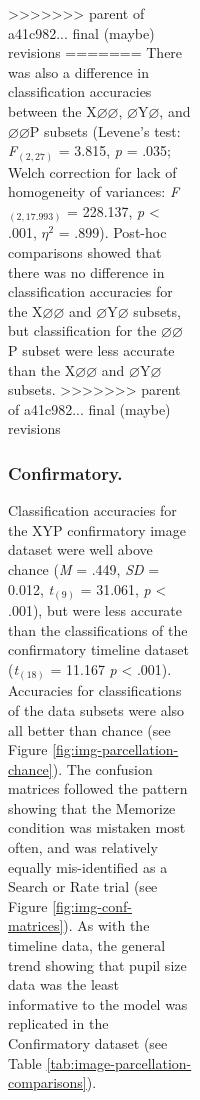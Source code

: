 \documentclass[
  english,
  man, donotrepeattitle,floatsintext]{apa6}
\begin{document}
\begin{figure}
\begin{figure}
\begin{figure}
\begin{figure}
>>>>>>> parent of a41c982... final (maybe) revisions
=======
There was also a difference in classification accuracies between the X\(\varnothing\varnothing\), \(\varnothing\)Y\(\varnothing\), and \(\varnothing\varnothing\)P subsets (Levene's test: \emph{F}\(_{(2, 27)}\) = 3.815, \emph{p} = .035; Welch correction for lack of homogeneity of variances: \emph{F}\(_{(2, 17.993)}\) = 228.137, \emph{p} \textless{} .001, \textit{$\eta$}\(^{2}\) = .899). Post-hoc comparisons showed that there was no difference in classification accuracies for the X\(\varnothing\varnothing\) and \(\varnothing\)Y\(\varnothing\) subsets, but classification for the \(\varnothing\varnothing\)P subset were less accurate than the X\(\varnothing\varnothing\) and \(\varnothing\)Y\(\varnothing\) subsets.
>>>>>>> parent of a41c982... final (maybe) revisions

\subsubsection{Confirmatory.}

Classification accuracies for the XYP confirmatory image dataset were well above chance (\emph{M} = .449, \emph{SD} = 0.012, \emph{t}\(_{(9)}\) = 31.061, \emph{p} \textless{} .001), but were less accurate than the classifications of the confirmatory timeline dataset (\emph{t}\(_{(18)}\) = 11.167 \emph{p} \textless{} .001). Accuracies for classifications of the data subsets were also all better than chance (see Figure \ref{fig:img-parcellation-chance}). The confusion matrices followed the pattern showing that the Memorize condition was mistaken most often, and was relatively equally mis-identified as a Search or Rate trial (see Figure \ref{fig:img-conf-matrices}). As with the timeline data, the general trend showing that pupil size data was the least informative to the model was replicated in the Confirmatory dataset (see Table \ref{tab:image-parcellation-comparisons}).


\end{figure}
\end{figure}
\end{figure}
\end{figure}
\end{document}
